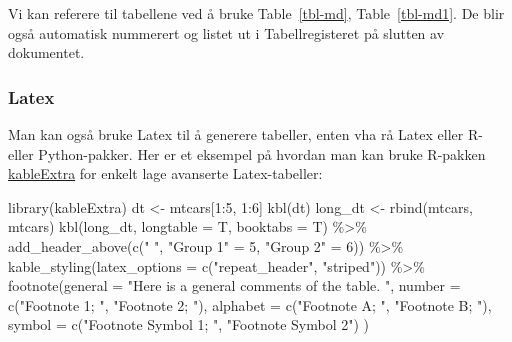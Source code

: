 \documentclass[
  10pt,
]{scrartcl}
\newenvironment{Shaded}{\begin{snugshade}}{\end{snugshade}}
\newcommand{\AttributeTok}[1]{\textcolor[rgb]{0.40,0.45,0.13}{#1}}
\newcommand{\DecValTok}[1]{\textcolor[rgb]{0.68,0.00,0.00}{#1}}
\newcommand{\FunctionTok}[1]{\textcolor[rgb]{0.28,0.35,0.67}{#1}}
\newcommand{\NormalTok}[1]{\textcolor[rgb]{0.00,0.23,0.31}{#1}}
\newcommand{\OtherTok}[1]{\textcolor[rgb]{0.00,0.23,0.31}{#1}}
\newcommand{\SpecialCharTok}[1]{\textcolor[rgb]{0.37,0.37,0.37}{#1}}
\newcommand{\StringTok}[1]{\textcolor[rgb]{0.13,0.47,0.30}{#1}}
\begin{document}
Vi kan referere til tabellene ved å bruke Table~\ref{tbl-md},
Table~\ref{tbl-md1}. De blir også automatisk nummerert og listet ut i
Tabellregisteret på slutten av dokumentet.

\subsubsection{Latex}\label{latex}

Man kan også bruke Latex til å generere tabeller, enten vha rå Latex
eller R- eller Python-pakker. Her er et eksempel på hvordan man kan
bruke R-pakken
\href{https://haozhu233.github.io/kableExtra/awesome_table_in_pdf.pdf}{kableExtra}
for enkelt lage avanserte Latex-tabeller:

\begin{Shaded}
\begin{Highlighting}[]
\FunctionTok{library}\NormalTok{(kableExtra)}
\NormalTok{dt }\OtherTok{\textless{}{-}}\NormalTok{ mtcars[}\DecValTok{1}\SpecialCharTok{:}\DecValTok{5}\NormalTok{, }\DecValTok{1}\SpecialCharTok{:}\DecValTok{6}\NormalTok{]}
\FunctionTok{kbl}\NormalTok{(dt)}
\NormalTok{long\_dt }\OtherTok{\textless{}{-}} \FunctionTok{rbind}\NormalTok{(mtcars, mtcars)}
\FunctionTok{kbl}\NormalTok{(long\_dt, }\AttributeTok{longtable =}\NormalTok{ T, }\AttributeTok{booktabs =}\NormalTok{ T) }\SpecialCharTok{\%\textgreater{}\%}
  \FunctionTok{add\_header\_above}\NormalTok{(}\FunctionTok{c}\NormalTok{(}\StringTok{" "}\NormalTok{, }\StringTok{"Group 1"} \OtherTok{=} \DecValTok{5}\NormalTok{, }\StringTok{"Group 2"} \OtherTok{=} \DecValTok{6}\NormalTok{)) }\SpecialCharTok{\%\textgreater{}\%}
  \FunctionTok{kable\_styling}\NormalTok{(}\AttributeTok{latex\_options =} \FunctionTok{c}\NormalTok{(}\StringTok{"repeat\_header"}\NormalTok{, }\StringTok{"striped"}\NormalTok{)) }\SpecialCharTok{\%\textgreater{}\%}
  \FunctionTok{footnote}\NormalTok{(}\AttributeTok{general =} \StringTok{"Here is a general comments of the table. "}\NormalTok{,}
          \AttributeTok{number =} \FunctionTok{c}\NormalTok{(}\StringTok{"Footnote 1; "}\NormalTok{, }\StringTok{"Footnote 2; "}\NormalTok{),}
          \AttributeTok{alphabet =} \FunctionTok{c}\NormalTok{(}\StringTok{"Footnote A; "}\NormalTok{, }\StringTok{"Footnote B; "}\NormalTok{),}
          \AttributeTok{symbol =} \FunctionTok{c}\NormalTok{(}\StringTok{"Footnote Symbol 1; "}\NormalTok{, }\StringTok{"Footnote Symbol 2"}\NormalTok{)}
\NormalTok{          )}
\end{Highlighting}
\end{Shaded}
\end{document}
